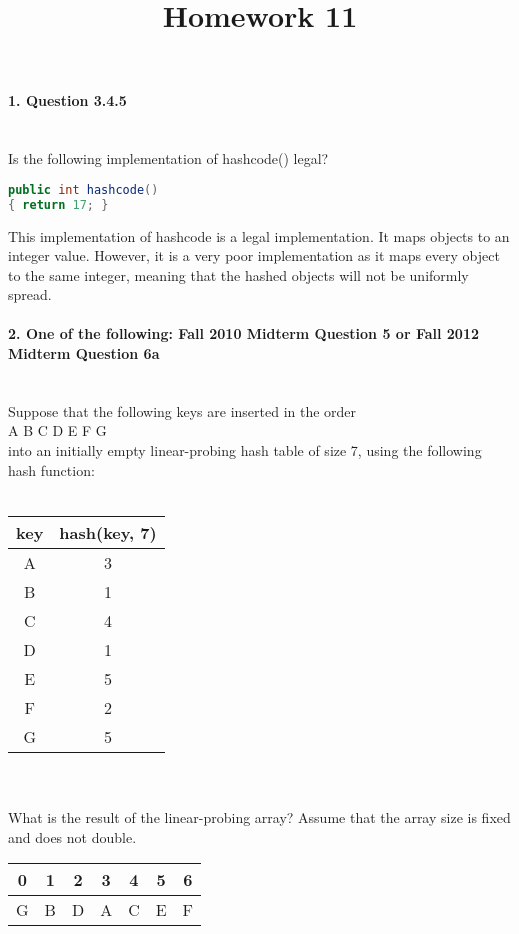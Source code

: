 \documentclass{article}
\begin{document}
\title{Homework 11}
\date{}
\maketitle


\paragraph{\Large 1. Question 3.4.5}\mbox{}\\
Is the following implementation of hashcode() legal?
\begin{lstlisting}[language=Java]
public int hashcode()
{ return 17; }
\end{lstlisting}

This implementation of hashcode is a legal implementation. It maps objects to an integer value. However, it is a very poor implementation as it maps every object to the same integer, meaning that the hashed objects will not be uniformly spread.

\paragraph{\Large 2. One of the following: Fall 2010 Midterm Question 5 or Fall 2012 Midterm Question 6a}\mbox{}\\
Suppose that the following keys are inserted in the order\\
A B C D E F G\\
into an initially empty linear-probing hash table of size 7, using the following hash function:\\\\
\begin{tabular}{c | c}

key & hash(key, 7)\\ \hline
A & 3 \\
B & 1 \\
C & 4 \\
D & 1 \\
E & 5 \\
F & 2 \\
G & 5 \\
\end{tabular}\\\\
What is the result of the linear-probing array? Assume that the array size is fixed and does not double.\\

\begin{tabular}{c | c | c | c | c | c | c }
0 & 1 & 2 & 3 & 4 & 5 & 6\\ \hline
G & B & D & A & C & E & F
\end{tabular}
\end{document}
